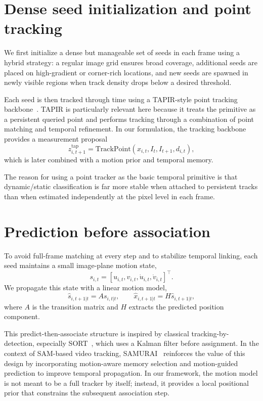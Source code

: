 \documentclass[11pt]{article}
\begin{document}
\section{Dense seed initialization and point tracking}
We first initialize a dense but manageable set of seeds in each frame using a hybrid strategy: a regular image grid ensures broad coverage, additional seeds are placed on high-gradient or corner-rich locations, and new seeds are spawned in newly visible regions when track density drops below a desired threshold.

Each seed is then tracked through time using a TAPIR-style point tracking backbone~\cite{tapir2023}. TAPIR is particularly relevant here because it treats the primitive as a persistent queried point and performs tracking through a combination of point matching and temporal refinement. In our formulation, the tracking backbone provides a measurement proposal
\begin{equation}
 z^{\mathrm{tap}}_{i,t+1}=\mathrm{TrackPoint}(x_{i,t}, I_t, I_{t+1}, d_{i,t}),
\end{equation}
which is later combined with a motion prior and temporal memory.

The reason for using a point tracker as the basic temporal primitive is that dynamic/static classification is far more stable when attached to persistent tracks than when estimated independently at the pixel level in each frame.

\section{Prediction before association}
To avoid full-frame matching at every step and to stabilize temporal linking, each seed maintains a small image-plane motion state,
\begin{equation}
 s_{i,t} = [u_{i,t}, v_{i,t}, \dot{u}_{i,t}, \dot{v}_{i,t}]^{\top}.
\end{equation}
We propagate this state with a linear motion model,
\begin{equation}
 \hat{s}_{i,t+1|t} = A s_{i,t|t},
 \qquad
 \hat{x}_{i,t+1|t} = H \hat{s}_{i,t+1|t},
\end{equation}
where $A$ is the transition matrix and $H$ extracts the predicted position component.

This predict-then-associate structure is inspired by classical tracking-by-detection, especially SORT~\cite{sort2016}, which uses a Kalman filter before assignment. In the context of SAM-based video tracking, SAMURAI~\cite{samurai2024} reinforces the value of this design by incorporating motion-aware memory selection and motion-guided prediction to improve temporal propagation. In our framework, the motion model is not meant to be a full tracker by itself; instead, it provides a local positional prior that constrains the subsequent association step.
\end{document}
